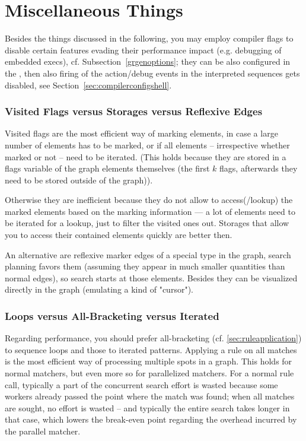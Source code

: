 \section{Miscellaneous Things}

Besides the things discussed in the following, you may employ compiler flags to disable certain features evading their performance impact (e.g. debugging of embedded execs), cf. Subsection~\ref{grgenoptions}; they can be also configured in the \GrShell{}, then also firing of the action/debug events in the interpreted sequences gets disabled, see Section~\ref{sec:compilerconfigshell}. 

\subsubsection*{Visited Flags versus Storages versus Reflexive Edges}
Visited flags are the most efficient way of marking elements, in case a large number of elements has to be marked, or if all elements -- irrespective whether marked or not -- need to be iterated.
(This holds because they are stored in a flags variable of the graph elements themselves (the first $k$ flags, afterwards they need to be stored outside of the graph)).

Otherwise they are inefficient because they do not allow to access(/lookup) the marked elements based on the marking information ---
a lot of elements need to be iterated for a lookup, just to filter the visited ones out.
Storages that allow you to access their contained elements quickly are better then.

An alternative are reflexive marker edges of a special type in the graph, search planning favors them (assuming they appear in much smaller quantities than normal edges), so search starts at those elements. 
Besides they can be visualized directly in the graph (emulating a kind of "cursor").

\subsubsection*{Loops versus All-Bracketing versus Iterated}
Regarding performance, you should prefer all-bracketing (cf. \ref{sec:ruleapplication}) to sequence loops and those to iterated patterns.
Applying a rule on all matches is the most efficient way of processing multiple spots in a graph.
This holds for normal matchers, but even more so for parallelized matchers.
For a normal rule call, typically a part of the concurrent search effort is wasted because some workers already passed the point where the match was found; 
when all matches are sought, no effort is wasted -- and typically the entire search takes longer in that case, which lowers the break-even point regarding the overhead incurred by the parallel matcher.

